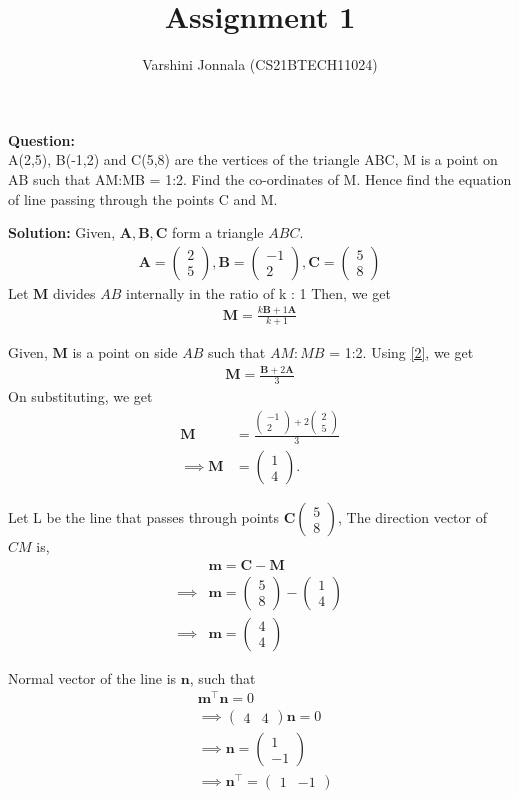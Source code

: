 \documentclass[journal,12pt,twocolumn]{IEEEtran}
\title{Assignment 1}
\author{Varshini Jonnala (CS21BTECH11024)}
\let\vec\mathbf
\newcommand{\myvec}[1]{\ensuremath{\begin{pmatrix}#1\end{pmatrix}}}
\begin{document}
    \maketitle
    \textbf{Question: }\\
      A(2,5), B(-1,2) and C(5,8) are the vertices of the triangle ABC, M is a point on AB such that AM:MB = 1:2. Find the co-ordinates of M. Hence find the equation of line passing through the points C and M.

    \textbf{Solution: }
     Given, $\vec{A}, \vec{B}, \vec{C}$ form a triangle $ABC$.
	\begin{align}
		\vec{A} = \myvec{2 \\ 5} ,
		\vec{B} = \myvec{-1 \\ 2},
		\vec{C} = \myvec{5 \\ 8}
	\end{align}
   Let $\vec{M}$ divides $AB$ internally in the ratio of k : 1
    Then, we get 
    \begin{align}
       \label{2} \vec{M}=\frac{k\vec{B}+1\vec{A}}{k+1}
    \end{align}

    Given, $\vec{M}$ is a point on side $AB$ such that $AM:MB$ = 1:2. 
        Using \eqref{2}, we get
    \begin{align}
        \vec{M} = \frac{\vec{B}+2\vec{A}}{3}
    \end{align}
    On substituting, we get
    \begin{align}
        \vec{M} &= \frac{\myvec{-1 \\ 2} + 2\myvec{2 \\ 5}}{3}\\ \implies \vec{M} &= \myvec{1\\4}.
    \end{align}
    
    Let L be the line that passes through points $\vec{C}\myvec{5\\8}$,
    The direction vector of $CM$ is,
    \begin{align}
        &\vec{m} = \vec{C} - \vec{M}\\
	    \implies &\vec{m} = \myvec{5 \\ 8} - \myvec{1 \\ 4}\\
	    \implies &\vec{m} = \myvec{4 \\ 4}
    \end{align}
    
    Normal vector of the line is $\vec{n}$, such that
    \begin{align}
	    &\vec{m}^{\top}\vec{n} = 0\\
	    &\implies \myvec{4 & 4}\vec{n} = 0\\
	    &\implies \vec{n} = \myvec{1 \\ -1}\\
	    &\implies \vec{n}^{\top} = \myvec{1 & -1}
    \end{align}
    
\end{document}
